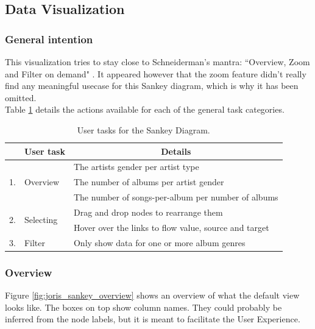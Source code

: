 \documentclass[a4paper, 11pt, oneside]{article}
\begin{document}
\subsection{Data Visualization}
\subsubsection{General intention}

This visualization tries to stay close to Schneiderman's mantra: ``Overview, Zoom and Filter on demand" \cite{shneiderman_eyes_1996}. It appeared however that the zoom feature didn't really find any meaningful usecase for this Sankey diagram, which is why it has been omitted.\\
Table \ref{tab:Joris_user_tasks} details the actions available for each of the general task categories.

\begin{table}[ht]
    \centering
    \begin{tabular}{lll}
        \toprule
                            & \multicolumn{1}{c}{\textbf{User task}} & \multicolumn{1}{c}{\textbf{Details}}                  \\ \midrule
        \multirow{3}{*}{1.} & \multirow{3}{*}{Overview}              & The artists gender per artist type                    \\
                            &                                        & The number of albums per artist gender                \\
                            &                                        & The number of songs-per-album per number of albums    \\ \midrule
        \multirow{2}{*}{2.} & \multirow{2}{*}{Selecting}             & Drag and drop nodes to rearrange them                 \\
                            &                                        & Hover over the links to flow value, source and target \\ \midrule
        3.                  & Filter                                 & Only show data for one or more album genres           \\ \bottomrule
    \end{tabular}
    \caption{User tasks for the Sankey Diagram.}
    \label{tab:Joris_user_tasks}
\end{table}



\subsubsection{Overview}
Figure \ref{fig:joris_sankey_overview} shows an overview of what the default view looks like. The boxes on top show column names. They could probably be inferred from the node labels, but it is meant to facilitate the User Experience.
\end{document}
